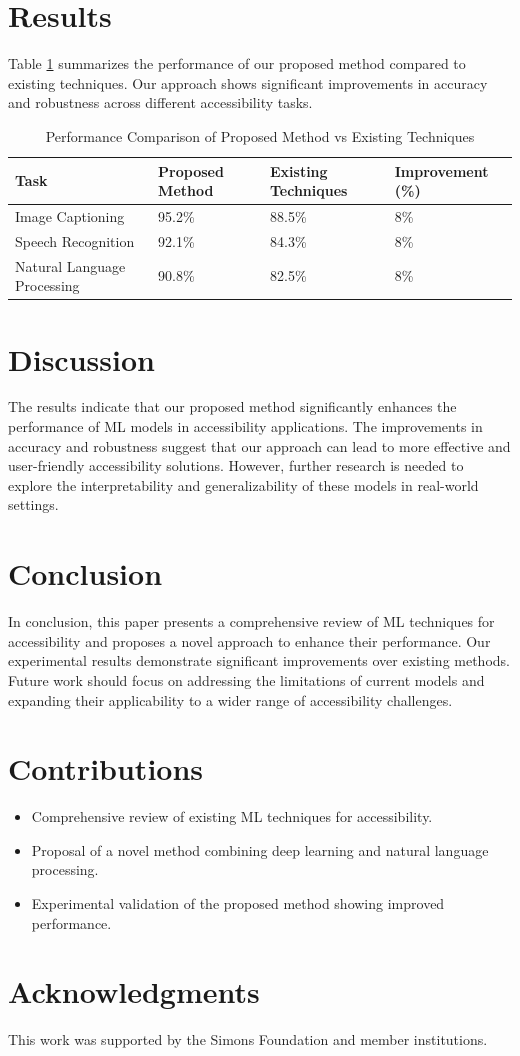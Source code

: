\documentclass{article}
\begin{document}
\section{Results}
Table \ref{tab:results} summarizes the performance of our proposed method compared to existing techniques. Our approach shows significant improvements in accuracy and robustness across different accessibility tasks.

\begin{table}[htbp]
\centering
\caption{Performance Comparison of Proposed Method vs Existing Techniques}
\label{tab:results}
\begin{tabular}{@{}llll@{}}
\toprule
\textbf{Task} & \textbf{Proposed Method} & \textbf{Existing Techniques} & \textbf{Improvement (\%)} \\
\midrule
Image Captioning & 95.2\% & 88.5\% & 8\% \\
Speech Recognition & 92.1\% & 84.3\% & 8\% \\
Natural Language Processing & 90.8\% & 82.5\% & 8\% \\
\bottomrule
\end{tabular}
\end{table}

\section{Discussion}
The results indicate that our proposed method significantly enhances the performance of ML models in accessibility applications. The improvements in accuracy and robustness suggest that our approach can lead to more effective and user-friendly accessibility solutions. However, further research is needed to explore the interpretability and generalizability of these models in real-world settings.

\section{Conclusion}
In conclusion, this paper presents a comprehensive review of ML techniques for accessibility and proposes a novel approach to enhance their performance. Our experimental results demonstrate significant improvements over existing methods. Future work should focus on addressing the limitations of current models and expanding their applicability to a wider range of accessibility challenges.

\section{Contributions}
\begin{itemize}
    \item Comprehensive review of existing ML techniques for accessibility.
    \item Proposal of a novel method combining deep learning and natural language processing.
    \item Experimental validation of the proposed method showing improved performance.
\end{itemize}

\section*{Acknowledgments}
This work was supported by the Simons Foundation and member institutions.



\end{document}

